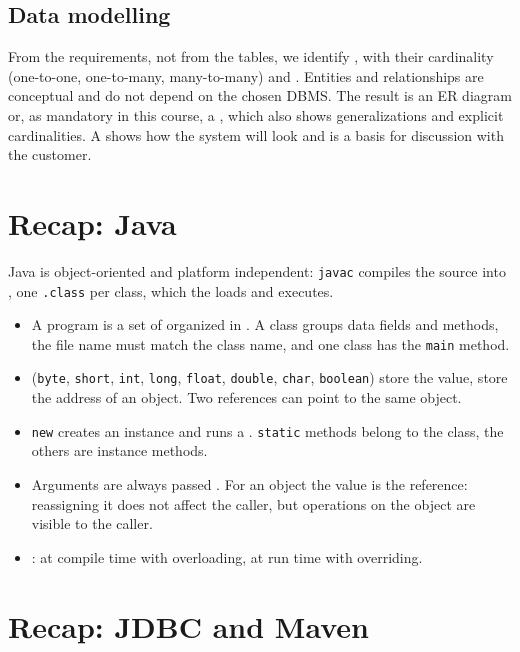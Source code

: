 \subsection{Data modelling}
From the requirements, not from the tables, we identify ,  with their cardinality (one-to-one, one-to-many, many-to-many) and . Entities and relationships are conceptual and do not depend on the chosen DBMS. The result is an ER diagram or, as mandatory in this course, a , which also shows generalizations and explicit cardinalities. A  shows how the system will look and is a basis for discussion with the customer.

\section{Recap: Java}
Java is object-oriented and platform independent: \texttt{javac} compiles the source into , one \texttt{.class} per class, which the  loads and executes.

\begin{itemize}
  \item A program is a set of  organized in . A class groups data fields and methods, the file name must match the class name, and one class has the \texttt{main} method.
  \item {} (\texttt{byte}, \texttt{short}, \texttt{int}, \texttt{long}, \texttt{float}, \texttt{double}, \texttt{char}, \texttt{boolean}) store the value,  store the address of an object. Two references can point to the same object.
  \item \texttt{new} creates an instance and runs a . \texttt{static} methods belong to the class, the others are instance methods.
  \item Arguments are always passed . For an object the value is the reference: reassigning it does not affect the caller, but operations on the object are visible to the caller.
  \item {}: at compile time with overloading, at run time with overriding.
\end{itemize}

\section{Recap: JDBC and Maven}\label{sec:jdbc}

